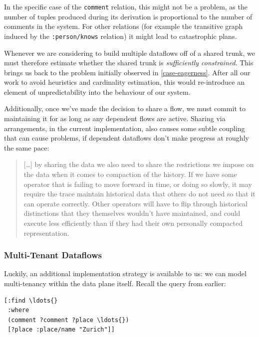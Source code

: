 \documentclass[../catalog.tex]{subfiles}
\begin{document}
In the specific case of the \texttt{comment} relation, this might not
be a problem, as the number of tuples produced during its derivation
is proportional to the number of comments in the system. For other
relations (for example the transitive graph induced by the
\texttt{:person/knows} relation) it might lead to catastrophic plans.

Whenever we are considering to build multiple dataflows off of a
shared trunk, we must therefore estimate whether the shared trunk is
\emph{sufficiently constrained}. This brings us back to the problem
initially observed in \ref{case-eagerness}. After all our work to
avoid heuristics and cardinality estimation, this would re-introduce
an element of unpredictability into the behaviour of our system.

Additionally, once we've made the decision to share a flow, we must
commit to maintaining it for as long as any dependent flows are
active. Sharing via arrangements, in the current implementation, also
causes some subtle coupling that can cause problems, if dependent
dataflows don't make progress at roughly the same pace:

\begin{quote}
[\ldots{}] by sharing the data we also need to share the restrictions
we impose on the data when it comes to compaction of the history. If
we have some operator that is failing to move forward in time, or
doing so slowly, it may require the trace maintain historical data
that others do not need so that it can operate correctly. Other
operators will have to flip through historical distinctions that they
themselves wouldn't have maintained, and could execute less
efficiently than if they had their own personally compacted
representation.

\cite{makingarrangements}
\end{quote}

\subsubsection{Multi-Tenant Dataflows}

Luckily, an additional implementation strategy is available to us: we
can model multi-tenancy within the data plane itself. Recall the query
from earlier:

\begin{verbatim}
[:find \ldots{}
 :where
 (comment ?comment ?place \ldots{})
 [?place :place/name "Zurich"]]
\end{verbatim}
\end{document}
